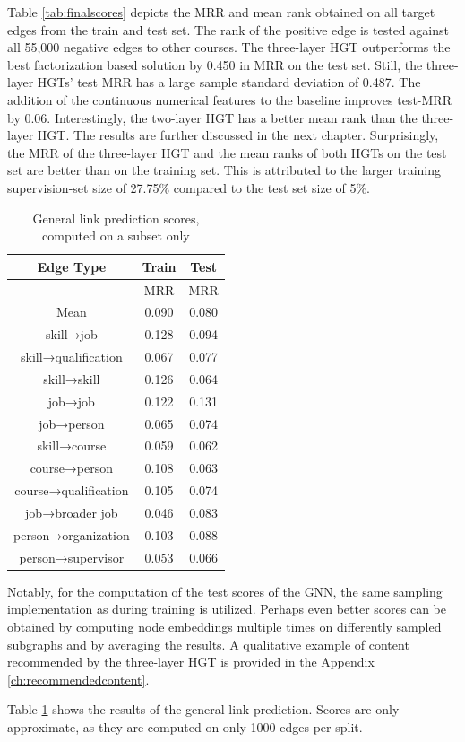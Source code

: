 Table \ref{tab:finalscores} depicts the MRR and mean rank obtained on all target edges from the train and test set. The rank of the positive edge is tested against all 55,000 negative edges to other courses. The three-layer HGT outperforms the best factorization based solution by 0.450 in MRR on the test set. Still, the three-layer HGTs' test MRR has a large sample standard deviation of 0.487. The addition of the continuous numerical features to the baseline improves test-MRR by 0.06. Interestingly, the two-layer HGT has a better mean rank than the three-layer HGT. The results are further discussed in the next chapter. Surprisingly, the MRR of the three-layer HGT and the mean ranks of both HGTs on the test set are better than on the training set. This is attributed to the larger training supervision-set size of 27.75\% compared to the test set size of 5\%.  


\begin{table}[h]
\centering

\begin{tabular}{|c|c|c|}
\hline
Edge Type & Train & Test \\
 \hline
  & MRR & MRR\\
  \hline
Mean &  0.090 & 0.080   \\
\hline
skill→job & 0.128 & 0.094  \\
\hline
skill→qualification &0.067 & 0.077  \\
\hline
skill→skill & 0.126 &0.064 \\
\hline
job→job &0.122 & 0.131\\
\hline
job→person & 0.065 &0.074 \\
\hline
skill→course & 0.059 &0.062 \\
\hline
course→person & 0.108 &0.063 \\
\hline
course→qualification & 0.105 &0.074 \\
\hline
job→broader job & 0.046 &0.083 \\
\hline
person→organization & 0.103 &0.088  \\
\hline
person→supervisor & 0.053 &0.066 \\
\hline

\end{tabular}
\caption[General link prediction scores]{General link prediction scores, computed on a subset only}
\label{tab:finalscoresgeneral}

\end{table}

Notably, for the computation of the test scores of the GNN, the same sampling implementation as during training is utilized. Perhaps even better scores can be obtained by computing node embeddings multiple times on differently sampled subgraphs and by averaging the results. A qualitative example of content recommended by the three-layer HGT is provided in the Appendix \ref{ch:recommendedcontent}.



Table \ref{tab:finalscoresgeneral} shows the results of the general link prediction. Scores are only approximate, as they are computed on only 1000 edges per split. 